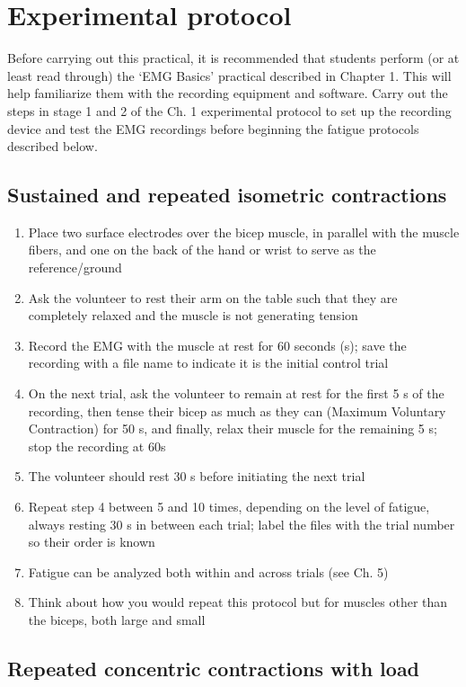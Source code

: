 \documentclass{article}
\begin{document}
\section{Experimental protocol}

Before carrying out this practical, it is recommended that students perform (or at least read through) the `EMG Basics' practical described in Chapter 1. This will help familiarize them with the recording equipment and software. Carry out the steps in stage 1 and 2 of the Ch. 1 experimental protocol to set up the recording device and test the EMG recordings before beginning the fatigue protocols described below.

\subsection{Sustained and repeated isometric contractions}

\begin{enumerate}
\item Place two surface electrodes over the bicep muscle, in parallel with the muscle fibers, and one on the back of the hand or wrist to serve as the reference/ground
\item Ask the volunteer to rest their arm on the table such that they are completely relaxed and the muscle is not generating tension
\item Record the EMG with the muscle at rest for 60 seconds (s); save the recording with a file name to indicate it is the initial control trial
\item On the next trial, ask the volunteer to remain at rest for the first 5 s of the recording, then tense their bicep as much as they can (Maximum Voluntary Contraction) for 50 s, and finally, relax their muscle for the remaining 5 s; stop the recording at 60s
\item The volunteer should rest 30 s before initiating the next trial
\item Repeat step 4 between 5 and 10 times, depending on the level of fatigue, always resting 30 s in between each trial; label the files with the trial number so their order is known
\item Fatigue can be analyzed both within and across trials (see Ch. 5)
\item Think about how you would repeat this protocol but for muscles other than the biceps, both large and small
\end{enumerate}

\subsection{Repeated concentric contractions with load}
\end{document}
